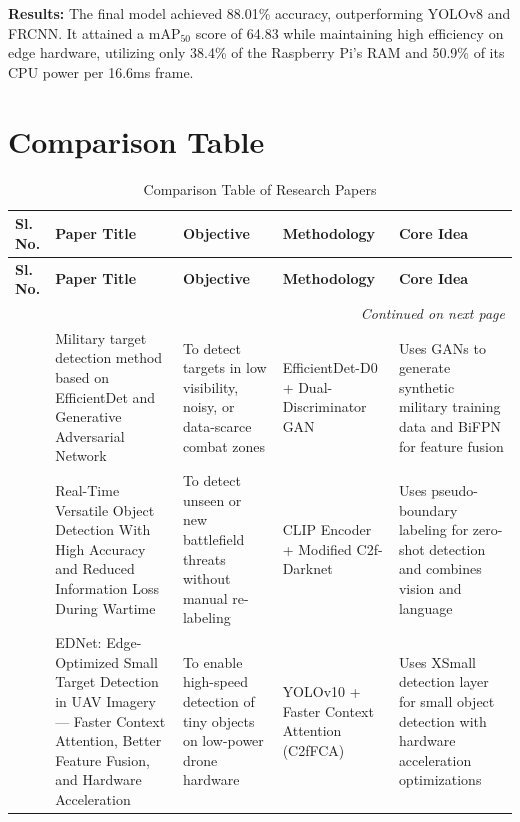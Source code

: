 \textbf{Results:} The final model achieved 88.01\% accuracy, outperforming YOLOv8 and FRCNN. It
attained a mAP$_{50}$ score of 64.83 while maintaining high efficiency on edge hardware, utilizing
only 38.4\% of the Raspberry Pi's RAM and 50.9\% of its CPU power per 16.6ms frame.


\label{end:supplementary}
\pagebreak
\section{Comparison Table}\label{sec:comparison}
\begingroup
  \renewcommand{\arraystretch}{1.5}
  \setlength{\tabcolsep}{5.9pt}
  \begin{longtable}{p{1.21cm} p{3cm} p{3cm} p{3cm} p{3cm}}
    \caption{Comparison Table of Research Papers}\label{tab:comparison} \\

    \toprule
    \textbf{Sl. No.} &
    \textbf{Paper Title} &
    \textbf{Objective} &
    \textbf{Methodology} &
    \textbf{Core Idea} \\
    \midrule
    \endfirsthead

    \toprule
    \textbf{Sl. No.} &
    \textbf{Paper Title} &
    \textbf{Objective} &
    \textbf{Methodology} &
    \textbf{Core Idea} \\
    \midrule
    \endhead

    \midrule
    \multicolumn{5}{r}{\textit{Continued on next page}} \\
    \midrule
    \endfoot

    \bottomrule
    \endlastfoot

    \cite{base_paper} &
    Military target detection method based on EfficientDet and Generative Adversarial Network &
    To detect targets in low visibility, noisy, or data-scarce combat zones &
    EfficientDet-D0 + Dual-Discriminator GAN &
    Uses GANs to generate synthetic military training data and BiFPN for feature fusion \\

    \cite{supplementary_paper_1} &
    Real-Time Versatile Object Detection With High Accuracy and Reduced Information Loss During Wartime &
    To detect unseen or new battlefield threats without manual re-labeling &
    CLIP Encoder + Modified C2f-Darknet &
    Uses pseudo-boundary labeling for zero-shot detection and combines vision and language \\

    \cite{supplementary_paper_2} &
    EDNet: Edge-Optimized Small Target Detection in UAV Imagery — Faster Context Attention, Better Feature Fusion, and Hardware Acceleration &
    To enable high-speed detection of tiny objects on low-power drone hardware &
    YOLOv10 + Faster Context Attention (C2fFCA) &
    Uses XSmall detection layer for small object detection with hardware acceleration optimizations \\


\end{longtable}
